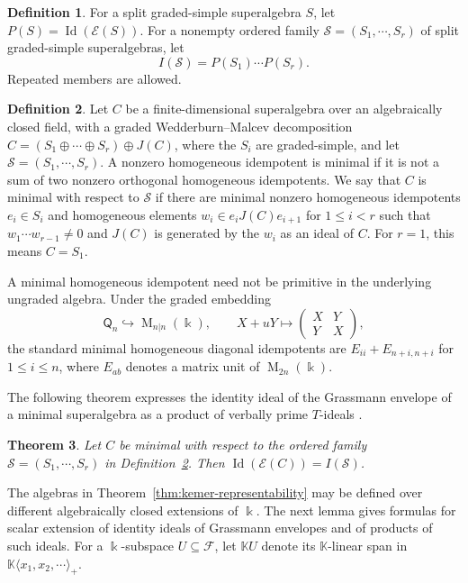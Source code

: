 \documentclass[11pt,reqno]{amsart}
\newcommand{\kk}{\Bbbk}
\newcommand{\KK}{\mathbb{K}}
\newcommand{\F}{\mathcal F}
\newcommand{\E}{\mathcal E}
\newcommand{\Id}{\operatorname{Id}}
\newcommand{\Mat}{\operatorname{M}}
\newcommand{\Qtype}{\mathsf Q}
\newtheorem{theorem}{Theorem}[section]
\theoremstyle{definition}
\newtheorem{definition}[theorem]{Definition}
\theoremstyle{remark}
\numberwithin{equation}{section}
\begin{document}
\begin{definition}\label{def:ordered-family}
For a split graded-simple superalgebra $S$, let
$P(S)=\Id(\E(S))$.
For a nonempty ordered family $\mathcal S=(S_1,\cdots,S_r)$
of split graded-simple superalgebras, let
\[
I(\mathcal S)=P(S_1)\cdots P(S_r).
\]
Repeated members are allowed.
\end{definition}

\begin{definition}\label{def:minimal-superalgebra}
Let $C$ be a finite-dimensional superalgebra over an algebraically
closed field, with a graded Wedderburn--Malcev decomposition $
C=(S_1\oplus\cdots\oplus S_r)\oplus J(C)$,
where the $S_i$ are graded-simple, and let
$\mathcal S=(S_1,\cdots,S_r)$.
A nonzero homogeneous idempotent is minimal if it is not a sum
of two nonzero orthogonal homogeneous idempotents.
We say that $C$ is minimal with respect to $\mathcal S$ if there
are minimal nonzero homogeneous idempotents $e_i\in S_i$
and homogeneous elements
$
w_i\in e_iJ(C)e_{i+1}$ for $1\leq i<r$
such that $w_1\cdots w_{r-1}\ne0$ and $J(C)$ is generated by
the $w_i$ as an ideal of $C$. For $r=1$, this means $C=S_1$.
\end{definition}

A minimal homogeneous idempotent need not be primitive in the
underlying ungraded algebra. Under the graded embedding
\[
\Qtype_n\hookrightarrow\Mat_{n|n}(\kk),\qquad
X+uY\longmapsto\begin{pmatrix}X&Y\\Y&X\end{pmatrix},
\]
the standard minimal homogeneous diagonal idempotents are
$E_{ii}+E_{n+i,n+i}$ for $1\leq i\leq n$, where $E_{ab}$ denotes
a matrix unit of $\Mat_{2n}(\kk)$.

The following theorem expresses the identity ideal of the
Grassmann envelope of a minimal superalgebra as a product
of verbally prime $T$-ideals \cite{GiambrunoZaicev2003}.



\begin{theorem}\label{thm:minimal-product}
Let $C$ be minimal with respect to the ordered family
$\mathcal S=(S_1,\cdots,S_r)$ in
Definition~\ref{def:minimal-superalgebra}. Then $\Id(\E(C))=I(\mathcal S)$.
\end{theorem}

The algebras in Theorem~\ref{thm:kemer-representability} may be
defined over different algebraically closed extensions of $\kk$.
The next lemma gives formulas for scalar extension of identity
ideals of Grassmann envelopes and of products of such ideals.
 For a $\kk$-subspace $U\subseteq\F$, let ${\KK}U$ denote its
$\KK$-linear span in $\KK\langle x_1,x_2,\cdots\rangle_+$.
\end{document}
